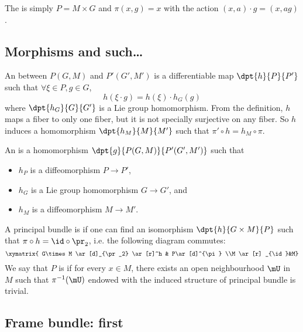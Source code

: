 			The  is simply $P=M\times G$ and $\pi(x,g)=x$ with the action $(x,a)\cdot g=(x,ag)$.

			\subsection{Morphisms and such\texorpdfstring{\ldots}{...}}

			An  between $P(G,M)$ and $P'(G',M')$ is a differentiable map $\dpt{h}{P}{P'}$ such that $\forall \xi\in P,g\in G$,
			\begin{equation}\label{eq:def_princ_homo}
h(\xi\cdot g)=h(\xi)\cdot h_G(g)
	\end{equation}
	where $\dpt{h_G}{G}{G'}$ is a Lie group homomorphism. From the definition, $h$ maps a fiber to only one fiber, but it is not specially surjective on any fiber. So $h$ induces a homomorphism $\dpt{h_M}{M}{M'}$ such that $\pi'\circ h=h_M\circ\pi$.

	An  is a homomorphism $\dpt{g}{P(G,M)}{P'(G',M')}$ such that

	\begin{itemize}
	\item $h_P$ is a diffeomorphism $P\to P'$,
	\item $h_G$ is a Lie group homomorphism $G\to G'$, and
	\item $h_M$ is a diffeomorphism $M\to M'$.
	\end{itemize}

	A principal bundle is  if one can find an isomorphism $\dpt{h}{G\times M}{P}$ such that $\pi\circ h=\id\circ\pr_2$, i.e. the following diagram commutes:
	\begin{equation}\label{diag:princ_triv}
	\xymatrix{ G\times M \ar[d]_{\pr_2} \ar[r]^h & P\ar[d]^{\pi} \\M \ar[r] _{\id}&M}
	\end{equation}
	We say that $P$ is  if for every $x\in M$, there exists an open neighbourhood $\mU$ in $M$ such that $\pi^{-1}(\mU)$ endowed with the induced structure of principal bundle is trivial.

	\subsection{Frame bundle: first}\label{pg:frame_bundle}

